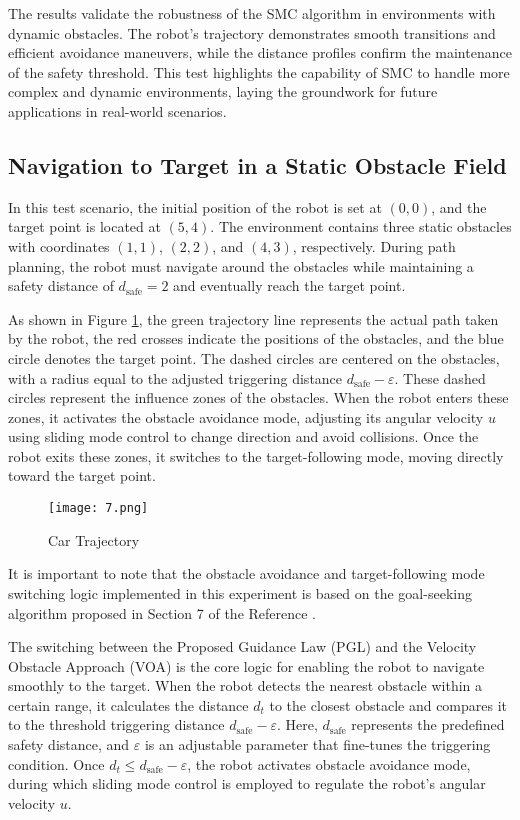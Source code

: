 The results validate the robustness of the SMC algorithm in environments with dynamic obstacles. The robot's trajectory demonstrates smooth transitions and efficient avoidance maneuvers, while the distance profiles confirm the maintenance of the safety threshold. This test highlights the capability of SMC to handle more complex and dynamic environments, laying the groundwork for future applications in real-world scenarios.

\subsection{Navigation to Target in a Static Obstacle Field}

In this test scenario, the initial position of the robot is set at $(0, 0)$, and the target point is located at $(5, 4)$. The environment contains three static obstacles with coordinates $(1, 1)$, $(2, 2)$, and $(4, 3)$, respectively. During path planning, the robot must navigate around the obstacles while maintaining a safety distance of $d_{\text{safe}} = 2$ and eventually reach the target point.

As shown in Figure \ref{FIG:7}, the green trajectory line represents the actual path taken by the robot, the red crosses indicate the positions of the obstacles, and the blue circle denotes the target point. The dashed circles are centered on the obstacles, with a radius equal to the adjusted triggering distance $d_{\text{safe}} - \varepsilon$. These dashed circles represent the influence zones of the obstacles. When the robot enters these zones, it activates the obstacle avoidance mode, adjusting its angular velocity $u$ using sliding mode control to change direction and avoid collisions. Once the robot exits these zones, it switches to the target-following mode, moving directly toward the target point.
\begin{figure}[H]
    \centering
    \texttt{[image: 7.png]}
    \caption{Car Trajectory}
    \label{FIG:7}
\end{figure}

It is important to note that the obstacle avoidance and target-following mode switching logic implemented in this experiment is based on the goal-seeking algorithm proposed in Section 7 of the Reference \cite{Matveev2012}. 

The switching between the Proposed Guidance Law (PGL) and the Velocity Obstacle Approach (VOA)\cite{Fiorini1998} is the core logic for enabling the robot to navigate smoothly to the target. When the robot detects the nearest obstacle within a certain range, it calculates the distance $d_t$ to the closest obstacle and compares it to the threshold triggering distance $d_{\text{safe}} - \varepsilon$. Here, $d_{\text{safe}}$ represents the predefined safety distance, and $\varepsilon$ is an adjustable parameter that fine-tunes the triggering condition. Once $d_t \leq d_{\text{safe}} - \varepsilon$, the robot activates obstacle avoidance mode, during which sliding mode control is employed to regulate the robot's angular velocity $u$.


